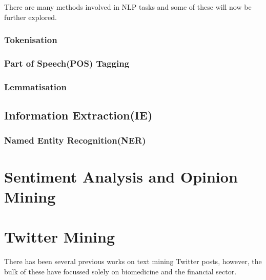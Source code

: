 There are many methods involved in NLP tasks and some of these will now be further explored.

\subsubsection{Tokenisation}

\subsubsection{Part of Speech(POS) Tagging}

\subsubsection{Lemmatisation}


\subsection[Information Extraction]{Information Extraction(IE)}

\subsubsection{Named Entity Recognition(NER)}

\section[Sentiment Analysis]{Sentiment Analysis and Opinion Mining}

\section{Twitter Mining}
There has been several previous works on text mining Twitter posts, however, the bulk of these have focussed solely on biomedicine and the financial sector.


